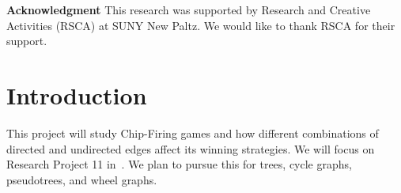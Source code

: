\documentclass[11pt,reqno]{amsart}
\DeclareMathOperator{\Pic}{Pic}
\newcommand{\Jac}{\textrm{Jac}}{}
\theoremstyle{definition}
\newtheorem*{goal}{\textbf{Goal}}
\theoremstyle{plain}
\begin{document}
\vspace*{\fill}

\textbf{Acknowledgment}\hspace{0.1cm} This research was supported by Research and Creative Activities (RSCA) at
SUNY New Paltz. We would like to thank RSCA for their support.

\pagebreak

\section{Introduction}
	This project will study Chip-Firing games and how different combinations of directed and undirected edges
	affect its winning strategies. We will focus on Research Project 11 in~\cite{glass2020chip}.
	We plan to pursue this for trees, cycle graphs, pseudotrees, and wheel graphs.


\bigskip
\end{document}
